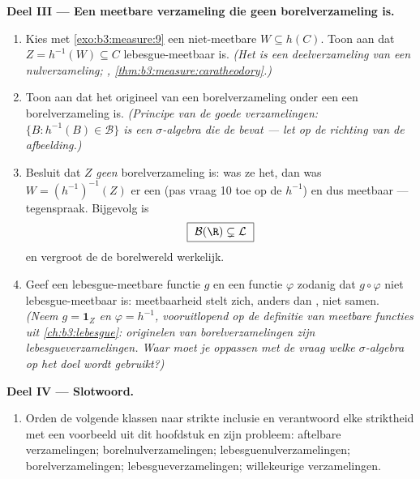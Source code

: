 \begin{problem}
\medskip
\noindent\textbf{Deel III --- Een meetbare verzameling die geen
borelverzameling is.}
\begin{enumerate}[resume]
  \item Kies met \cref{exo:b3:measure:9} een niet-meetbare $W
        \subseteq h(C)$. Toon aan dat $Z = h^{-1}(W) \subseteq C$
        lebesgue-meetbaar is. \emph{(Het is een deelverzameling
        van een nulverzameling; ,
        \cref{thm:b3:measure:caratheodory}.)}
  \item Toon aan dat het origineel van een borelverzameling onder
        een  een borelverzameling is.
        \emph{(Principe van de goede verzamelingen: $\{B :
        h^{-1}(B) \in \mathcal B\}$ is een $\sigma$-algebra die de
         bevat --- let op de richting van de
        afbeelding.)}
  \item Besluit dat $Z$ \emph{geen} borelverzameling is: was ze
        het, dan was $W = (h^{-1})^{-1}(Z)$ er een (pas vraag 10
        toe op de  $h^{-1}$) en dus meetbaar ---
        tegenspraak. Bijgevolg is
        \[
        \boxed{\ \mathcal B(\R) \subsetneq \mathcal L\ }
        \]
        en vergroot de  de borelwereld werkelijk.
  \item Geef een lebesgue-meetbare functie $g$ en een 
        functie $\varphi$ zodanig dat $g \circ \varphi$ niet
        lebesgue-meetbaar is: meetbaarheid stelt zich, anders dan
        , niet samen. \emph{(Neem $g = \mathbf 1_Z$ en
        $\varphi = h^{-1}$, vooruitlopend op de definitie van
        meetbare functies uit \cref{ch:b3:lebesgue}: originelen
        van borelverzamelingen zijn lebesgueverzamelingen. Waar
        moet je oppassen met de vraag welke $\sigma$-algebra op
        het doel wordt gebruikt?)}
\end{enumerate}

\medskip
\noindent\textbf{Deel IV --- Slotwoord.}
\begin{enumerate}[resume]
  \item Orden de volgende klassen naar strikte inclusie en
        verantwoord elke striktheid met een voorbeeld uit dit
        hoofdstuk en zijn probleem: aftelbare verzamelingen;
        borelnulverzamelingen; lebesguenulverzamelingen;
        borelverzamelingen; lebesgueverzamelingen; willekeurige
        verzamelingen.
\end{enumerate}


\end{problem}

